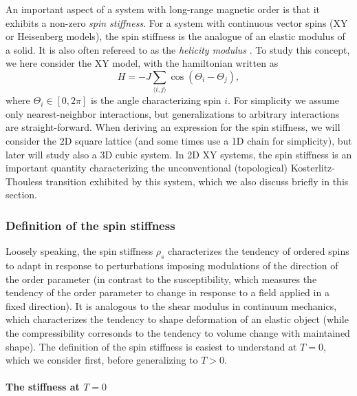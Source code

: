 \documentclass[draft,numberedheadings]{aipproc}
\begin{document}
An important aspect of a system with long-range magnetic order is that it exhibits a non-zero {\it spin stiffness}. For a system with continuous
vector spins (XY or Heisenberg models), the spin stiffness is the analogue of an elastic modulus of a solid. It is also often refereed to as the 
{\it helicity modulus} \cite{fisher73}. To study this concept, we here consider the XY model, with the hamiltonian written as
\begin{equation}
H=-J\sum_{\langle i,j\rangle}\cos(\Theta_i-\Theta_j),
\end{equation}
where $\Theta_i \in [0,2\pi]$ is the angle characterizing spin $i$. For simplicity we assume only nearest-neighbor interactions, but generalizations 
to arbitrary interactions are straight-forward. When deriving an expression for the spin stiffness, we will consider the 2D square lattice (and some 
times use a 1D chain for simplicity), but later will study also a 3D cubic system. In 2D XY systems, the spin stiffness is an important quantity
characterizing the unconventional (topological) Kosterlitz-Thouless transition exhibited by this system, which we also discuss briefly in this section.

\subsubsection{Definition of the spin stiffness}

Loosely speaking, the spin stiffness $\rho_s$ characterizes the tendency of ordered spins to adapt in response to perturbations imposing modulations 
of the direction of the order parameter (in contrast to the susceptibility, which measures the tendency of the order parameter to change in response 
to a field applied in a fixed direction). It is analogous to the shear modulus in continuum mechanics, which characterizes the tendency to shape 
deformation of an elastic object (while the compressibility corresonds to the tendency to volume change with maintained shape). The definition of the 
spin stiffness is easiest to understand at $T=0$, which we consider first, before generalizing to $T>0$.

\paragraph{The stiffness at $T=0$}
\end{document}

